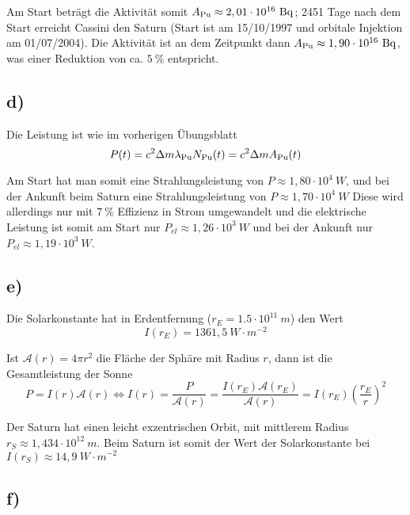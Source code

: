 \documentclass[12pt]{article}
\begin{document}
Am Start beträgt die Aktivität somit $A_{\ce{Pu}} \approx 2,01 \cdot 10^{16} \ \si{Bq}$; 2451 Tage nach dem Start erreicht Cassini den Saturn (Start ist am 15/10/1997 und orbitale Injektion am 01/07/2004). Die Aktivität ist an dem Zeitpunkt dann $A_{\ce{Pu}} \approx 1,90 \cdot 10^{16} \ \si{Bq}$, was einer Reduktion von ca. $5 \ \%$ entspricht.

\subsection{d)}

Die Leistung ist wie im vorherigen Übungsblatt 
\begin{equation*}
    P(t) = c^2 \Delta m \lambda_{\ce{Pu}} N_{\ce{Pu}}(t) = c^2 \Delta m A_{\ce{Pu}}(t)
\end{equation*}

Am Start hat man somit eine Strahlungsleistung von $P \approx 1,80 \cdot 10^4 \ \si{W}$, und bei der Ankunft beim Saturn eine Strahlungsleistung von $P \approx 1,70 \cdot 10^4 \ \si{W}$
Diese wird allerdings nur mit $7 \ \%$ Effizienz in Strom umgewandelt und die elektrische Leistung ist somit am Start nur $P_{el} \approx 1,26 \cdot 10^3 \ \si{W}$ und bei der Ankunft nur $P_{el} \approx 1,19 \cdot 10^3 \ \si{W}$.

\subsection{e)}

Die Solarkonstante hat in Erdentfernung ($r_E = 1.5 \cdot 10^{11} \ \si{m}$) den Wert
$$I(r_E) = 1361,5 \ \si{W} \cdot \si{m}^{-2}$$

Ist $\mathcal{A}(r) = 4 \pi r^2$ die Fläche der Sphäre mit Radius $r$, dann ist die Gesamtleistung der Sonne
\begin{equation*}
    P = I(r) \mathcal{A}(r) \Leftrightarrow I(r) = \frac{P}{\mathcal{A}(r)} = \frac{I(r_E) \mathcal{A}(r_E)}{\mathcal{A}(r)} = I(r_E) \left( \frac{r_E}{r} \right)^2
\end{equation*}

Der Saturn hat einen leicht exzentrischen Orbit, mit mittlerem Radius $r_S \approx 1,434 \cdot 10^{12} \ \si{m}$. Beim Saturn ist somit der Wert der Solarkonstante bei $I(r_S) \approx 14,9 \ \si{W} \cdot \si{m}^{-2}$

\subsection{f)}
\end{document}
